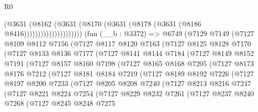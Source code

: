 \begin{lexlean}{R0}
\begin{coremodule}
                              (@3631
                                (@8162
                                  (@3631
                                    (@8170 (@3631 (@8178 (@3631 (@8186 @8416)))))))))))))))))))))
    (fun (__b : @3372) =>
    @6749
      (@7129
        @7149
        (@7127
          @8109
          @8112
          @7156
          (@7127
            @8117
            @8120
            @7163
            (@7127
              @8125
              @8128
              @7170
              (@7127
                @8133
                @8136
                @7177
                (@7127
                  @8141
                  @8144
                  @7184
                  (@7127
                    @8149
                    @8152
                    @7191
                    (@7127
                      @8157
                      @8160
                      @7198
                      (@7127
                        @8165
                        @8168
                        @7205
                        (@7127
                          @8173
                          @8176
                          @7212
                          (@7127
                            @8181
                            @8184
                            @7219
                            (@7127
                              @8189
                              @8192
                              @7226
                              (@7127
                                @8197
                                @8200
                                @7233
                                (@7127
                                  @8205
                                  @8208
                                  @7240
                                  (@7127
                                    @8213
                                    @8216
                                    @7247
                                    (@7127
                                      @8221
                                      @8224
                                      @7254
                                      (@7127
                                        @8229
                                        @8232
                                        @7261
                                        (@7127
                                          @8237
                                          @8240
                                          @7268
                                          (@7127
                                            @8245
                                            @8248
                                            @7275

\end{coremodule}
\end{lexlean}
